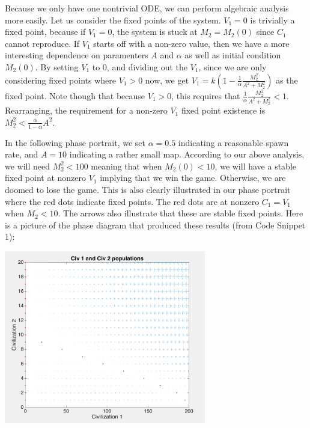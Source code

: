 \documentclass[12pt]{article}
\begin{document}
Because we only have one nontrivial ODE, we can perform algebraic analysis more easily. Let us consider the fixed points of the system. $V_1 = 0$ is trivially a fixed point, because if $V_1 = 0$, the system is stuck at $M_2 = M_2(0)$ since $C_1$ cannot reproduce. If $V_1$ starts off with a non-zero value, then we have a more interesting dependence on paramenters $A$ and $\alpha$ as well as initial condition $M_2(0)$. By setting $\dot V_1$ to 0, and dividing out the $V_1$, since we are only considering fixed points where $V_1 > 0$ now, we get $V_1 = k(1 - \frac{1}{\alpha} \frac{M_2^2}{A^2 + M_2^2})$ as the fixed point. Note though that because $V_1 > 0$, this requires that $\frac{1}{\alpha} \frac{M_2^2}{A^2 + M_2^2} < 1$. Rearranging, the requirement for a non-zero $V_1$ fixed point existence is $M_2^2 < \frac{\alpha}{1 - \alpha} A^2$.\par
In the following phase portrait, we set $\alpha = 0.5$ indicating a reasonable spawn rate, and $A=10$ indicating a rather small map. According to our above analysis, we will need $M_2^2 < 100$ meaning that when $M_2(0) < 10$, we will have a stable fixed point at nonzero $V_1$ implying that we win the game. Otherwise, we are doomed to lose the game. This is also clearly illustrated in our phase portrait where the red dots indicate fixed points. The red dots are at nonzero $C_1 = V_1$ when $M_2 < 10$. The arrows also illustrate that these are stable fixed points.  Here is a picture of the phase diagram that produced these results (from Code Snippet 1):
\begin{center}
\includegraphics[width=250pt]{phaseplot_basic}
\end{center}
\end{document}
